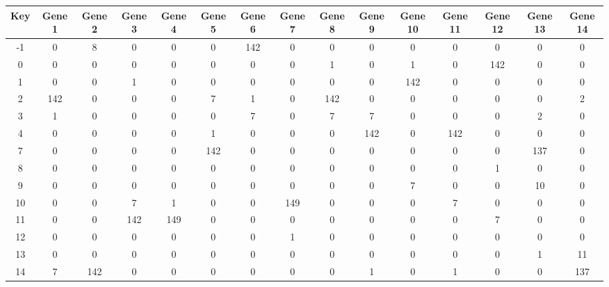 \begin{tabular}{|c|c|c|c|c|c|c|c|c|c|c|c|c|c|c|}
\hline
Key & Gene 1 & Gene 2 & Gene 3 & Gene 4 & Gene 5 & Gene 6 & Gene 7 & Gene 8 & Gene 9 & Gene 10 & Gene 11 & Gene 12 & Gene 13 & Gene 14 \\
\hline
-1 & 0 & 8 & 0 & 0 & 0 & 142 & 0 & 0 & 0 & 0 & 0 & 0 & 0 & 0 \\
0 & 0 & 0 & 0 & 0 & 0 & 0 & 0 & 1 & 0 & 1 & 0 & 142 & 0 & 0 \\
1 & 0 & 0 & 1 & 0 & 0 & 0 & 0 & 0 & 0 & 142 & 0 & 0 & 0 & 0 \\
2 & 142 & 0 & 0 & 0 & 7 & 1 & 0 & 142 & 0 & 0 & 0 & 0 & 0 & 2 \\
3 & 1 & 0 & 0 & 0 & 0 & 7 & 0 & 7 & 7 & 0 & 0 & 0 & 2 & 0 \\
4 & 0 & 0 & 0 & 0 & 1 & 0 & 0 & 0 & 142 & 0 & 142 & 0 & 0 & 0 \\
7 & 0 & 0 & 0 & 0 & 142 & 0 & 0 & 0 & 0 & 0 & 0 & 0 & 137 & 0 \\
8 & 0 & 0 & 0 & 0 & 0 & 0 & 0 & 0 & 0 & 0 & 0 & 1 & 0 & 0 \\
9 & 0 & 0 & 0 & 0 & 0 & 0 & 0 & 0 & 0 & 7 & 0 & 0 & 10 & 0 \\
10 & 0 & 0 & 7 & 1 & 0 & 0 & 149 & 0 & 0 & 0 & 7 & 0 & 0 & 0 \\
11 & 0 & 0 & 142 & 149 & 0 & 0 & 0 & 0 & 0 & 0 & 0 & 7 & 0 & 0 \\
12 & 0 & 0 & 0 & 0 & 0 & 0 & 1 & 0 & 0 & 0 & 0 & 0 & 0 & 0 \\
13 & 0 & 0 & 0 & 0 & 0 & 0 & 0 & 0 & 0 & 0 & 0 & 0 & 1 & 11 \\
14 & 7 & 142 & 0 & 0 & 0 & 0 & 0 & 0 & 1 & 0 & 1 & 0 & 0 & 137 \\
\hline
\end{tabular}